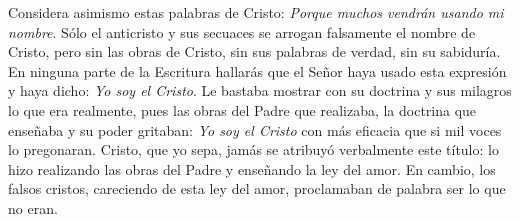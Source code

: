 \begin{body}
	Considera asimismo estas palabras de Cristo: \emph{Porque muchos vendrán usando mi nombre}. Sólo el anticristo y sus secuaces se arrogan falsamente el nombre de Cristo, pero sin las obras de Cristo, sin sus palabras de verdad, sin su sabiduría. En ninguna parte de la Escritura hallarás que el Señor haya usado esta expresión y haya dicho: \emph{Yo soy el Cristo}. Le bastaba mostrar con su doctrina y sus milagros lo que era realmente, pues las obras del Padre que realizaba, la doctrina que enseñaba y su poder gritaban: \emph{Yo soy el Cristo} con más eficacia que si mil voces lo pregonaran. Cristo, que yo sepa, jamás se atribuyó verbalmente este título: lo hizo realizando las obras del Padre y enseñando la ley del amor. En cambio, los falsos cristos, careciendo de esta ley del amor, proclamaban de palabra ser lo que no eran.				
\end{body}


